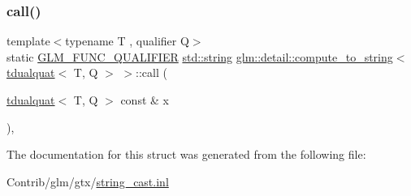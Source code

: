 \subsubsection{\texorpdfstring{call()}{call()}}
{\footnotesize\ttfamily template$<$typename T , qualifier Q$>$ \\
static \mbox{\hyperlink{setup_8hpp_a33fdea6f91c5f834105f7415e2a64407}{G\+L\+M\+\_\+\+F\+U\+N\+C\+\_\+\+Q\+U\+A\+L\+I\+F\+I\+ER}} \mbox{\hyperlink{_s_d_l__opengl__glext_8h_ae84541b4f3d8e1ea24ec0f466a8c568b}{std\+::string}} \mbox{\hyperlink{structglm_1_1detail_1_1compute__to__string}{glm\+::detail\+::compute\+\_\+to\+\_\+string}}$<$ \mbox{\hyperlink{structglm_1_1tdualquat}{tdualquat}}$<$ T, Q $>$ $>$\+::call (\begin{DoxyParamCaption}\item[{\mbox{\hyperlink{structglm_1_1tdualquat}{tdualquat}}$<$ T, Q $>$ const \&}]{x }\end{DoxyParamCaption})\hspace{0.3cm}{\ttfamily [inline]}, {\ttfamily [static]}}



The documentation for this struct was generated from the following file\+:\begin{DoxyCompactItemize}
\item 
Contrib/glm/gtx/\mbox{\hyperlink{string__cast_8inl}{string\+\_\+cast.\+inl}}\end{DoxyCompactItemize}
